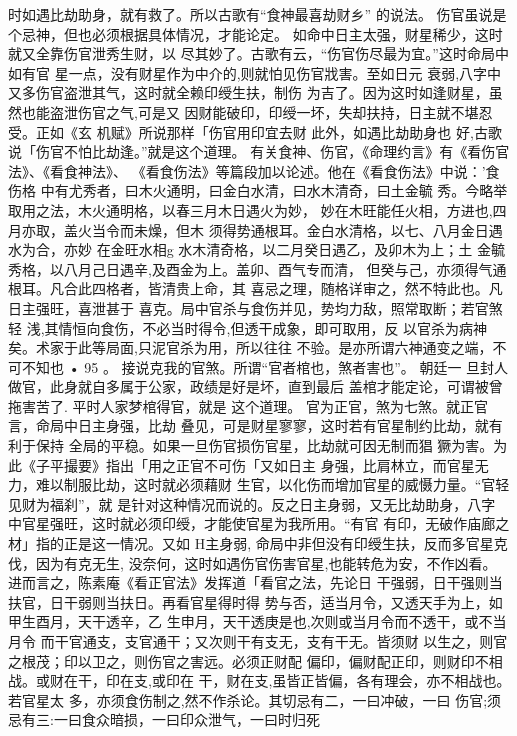 时如遇比劫助身，就有救了。所以古歌有“食神最喜劫财乡”
的说法。
伤官虽说是个忌神，但也必须根据具体情况，才能论定。
如命中日主太强，财星稀少，这时就又全靠伤官泄秀生财，以
尽其妙了。古歌有云，“伤官伤尽最为宜。”这时命局中如有官
星一点，没有财星作为中介的,则就怕见伤官戕害。至如日元
衰弱,八字中又多伤官盗泄其气，这时就全赖印绶生扶，制伤
为吉了。因为这时如逢财星，虽然也能盗泄伤官之气,可是又
因财能破印，印绶一坏，失却扶持，日主就不堪忍受。正如《玄
机赋》所说那样「伤官用印宜去财 此外，如遇比劫助身也
好,古歌说「伤官不怕比劫逢。”就是这个道理。
有关食神、伤官，《命理约言》有《看伤官法》、《看食神法》、
《看食伤法》等篇段加以论述。他在《看食伤法》中说：'食伤格
中有尤秀者，曰木火通明，曰金白水清，曰水木清奇，曰土金毓
秀。今略举取用之法，木火通明格，以春三月木日遇火为妙，
妙在木旺能任火相，方进也,四月亦取，盖火当令而未燥，但木
须得势通根耳。金白水清格，以七、八月金日遇水为合，亦妙
在金旺水相g 水木清奇格，以二月癸日遇乙，及卯木为上；土
金毓秀格，以八月己日遇辛,及酉金为上。盖卯、酉气专而清，
但癸与己，亦须得气通根耳。凡合此四格者，皆清贵上命，其
喜忌之理，随格详审之，然不特此也。凡日主强旺，喜泄甚于
喜克。局中官杀与食伤并见，势均力敌，照常取断；若官煞轻
浅,其情恒向食伤，不必当时得令,但透干成象，即可取用，反
以官杀为病神矣。术家于此等局面,只泥官杀为用，所以往往
不验。是亦所谓六神通变之端，不可不知也
• 95 。
接说克我的官煞。所谓“官者棺也，煞者害也”。 朝廷一
旦封人做官，此身就自多属于公家，政绩是好是坏，直到最后
盖棺才能定论，可谓被曾拖害苦了. 平时人家梦棺得官，就是
这个道理。
官为正官，煞为七煞。就正官言，命局中日主身强，比劫
叠见，可是财星寥寥，这时若有官星制约比劫，就有利于保持
全局的平稳。如果一旦伤官损伤官星，比劫就可因无制而猖
獗为害。为此《子平撮要》指出「用之正官不可伤「又如日主
身强，比肩林立，而官星无力，难以制服比劫，这时就必须藉财
生官，以化伤而增加官星的威慑力量。“官轻见财为福刹”，就
是针对这种情况而说的。反之日主身弱，又无比劫助身，八字
中官星强旺，这时就必须印绶，才能使官星为我所用。“有官
有印，无破作庙廊之材」指的正是这一情况。又如 H主身弱,
命局中非但没有印绶生扶，反而多官星克伐，因为有克无生,
没奈何，这时如遇伤官伤害官星,也能转危为安，不作凶看。
进而言之，陈素庵《看正官法》发挥道「看官之法，先论日
干强弱，日干强则当扶官，日干弱则当扶日。再看官星得时得
势与否，适当月令，又透天手为上，如甲生酉月，天干透辛，乙
生申月，天干透庚是也,次则或当月令而不透干，或不当月令
而干官通支，支官通干；又次则干有支无，支有干无。皆须财
以生之，则官之根茂；印以卫之，则伤官之害远。必须正财配
偏印，偏财配正印，则财印不相战。或财在干，印在支,或印在
干，财在支,虽皆正皆偏，各有理会，亦不相战也。若官星太
多，亦须食伤制之,然不作杀论。其切忌有二，一曰冲破，一曰
伤官;须忌有三:一曰食众暗损，一曰印众泄气，一曰时归死

